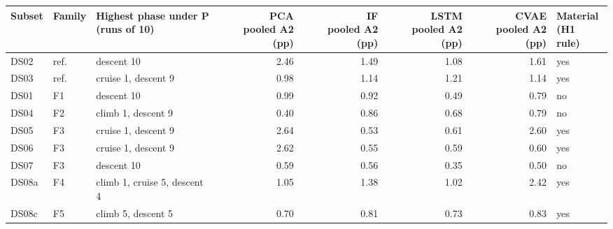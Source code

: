 \begin{tabular}{ll>{\raggedright\arraybackslash}p{}rrrrl}
\toprule
Subset & Family & \makecell{Highest phase under P\\(runs of 10)} & \makecell{PCA\\pooled A2 (pp)} & \makecell{IF\\pooled A2 (pp)} & \makecell{LSTM\\pooled A2 (pp)} & \makecell{CVAE\\pooled A2 (pp)} & \makecell{Material\\(H1 rule)} \\
\midrule
DS02 & ref. & descent 10 & 2.46 & 1.49 & 1.08 & 1.61 & yes \\
DS03 & ref. & cruise 1, descent 9 & 0.98 & 1.14 & 1.21 & 1.14 & yes \\
\midrule
DS01 & F1 & descent 10 & 0.99 & 0.92 & 0.49 & 0.79 & no \\
DS04 & F2 & climb 1, descent 9 & 0.40 & 0.86 & 0.68 & 0.79 & no \\
DS05 & F3 & cruise 1, descent 9 & 2.64 & 0.53 & 0.61 & 2.60 & yes \\
DS06 & F3 & cruise 1, descent 9 & 2.62 & 0.55 & 0.59 & 0.60 & yes \\
DS07 & F3 & descent 10 & 0.59 & 0.56 & 0.35 & 0.50 & no \\
DS08a & F4 & climb 1, cruise 5, descent 4 & 1.05 & 1.38 & 1.02 & 2.42 & yes \\
DS08c & F5 & climb 5, descent 5 & 0.70 & 0.81 & 0.73 & 0.83 & yes \\
\bottomrule
\end{tabular}
